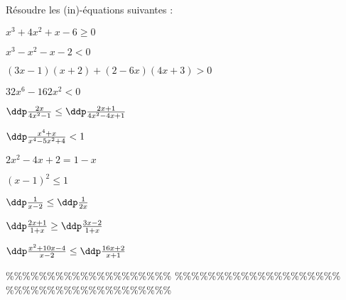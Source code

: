 



\begin{exercice}
 Résoudre les (in)-équations suivantes : 

\begin{enumerate}
\begin{minipage}[t]{0.45\textwidth}

\item $x^3+4x^2+x-6\geq 0 $ 
\item  $x^3-x^2-x-2<0 $ 
\item  $(3x-1)(x+2)+(2-6x)(4x+3)>0$
\item $32x^6-162x^2<0$
\item  $\ddp\frac{2x}{4x^2-1}\leq \ddp\frac{2x+1}{4x^2-4x+1}$
\item  $ \ddp\frac{x^4+x}{x^4-5x^2+4}<1 $
\end{minipage}
\begin{minipage}[t]{0.45\textwidth}
\item  $2x^2-4x+2=1-x$
\item  $(x-1)^2\leq 1$
\item $\ddp\frac{1}{x-2}\leq \ddp\frac{1}{2x}$
\item $\ddp\frac{2x+1}{1+x}\geq \ddp\frac{3x-2}{1+x}$
\item $\ddp\frac{x^2+10x-4}{x-2}\leq \ddp\frac{16x+2}{x+1}$


\end{minipage}
\end{enumerate}

\end{exercice}


\%\%\%\%\%\%\%\%\%\%\%\%\%\%\%\%\%\%\%\%
\%\%\%\%\%\%\%\%\%\%\%\%\%\%\%\%\%\%\%\%
\%\%\%\%\%\%\%\%\%\%\%\%\%\%\%\%\%\%\%\%




